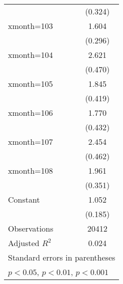 \begin{table}[htbp]
\begin{tabular}{l*{1}{c}}
                    &     (0.324)         \\
[1em]
xmonth=103          &       1.604\sym{***}\\
                    &     (0.296)         \\
[1em]
xmonth=104          &       2.621\sym{***}\\
                    &     (0.470)         \\
[1em]
xmonth=105          &       1.845\sym{***}\\
                    &     (0.419)         \\
[1em]
xmonth=106          &       1.770\sym{***}\\
                    &     (0.432)         \\
[1em]
xmonth=107          &       2.454\sym{***}\\
                    &     (0.462)         \\
[1em]
xmonth=108          &       1.961\sym{***}\\
                    &     (0.351)         \\
[1em]
Constant            &       1.052\sym{***}\\
                    &     (0.185)         \\
\hline
Observations        &       20412         \\
Adjusted \(R^{2}\)  &       0.024         \\
\hline\hline
\multicolumn{2}{l}{\footnotesize Standard errors in parentheses}\\
\multicolumn{2}{l}{\footnotesize \sym{*} \(p<0.05\), \sym{**} \(p<0.01\), \sym{***} \(p<0.001\)}\\
\end{tabular}
\end{table}
